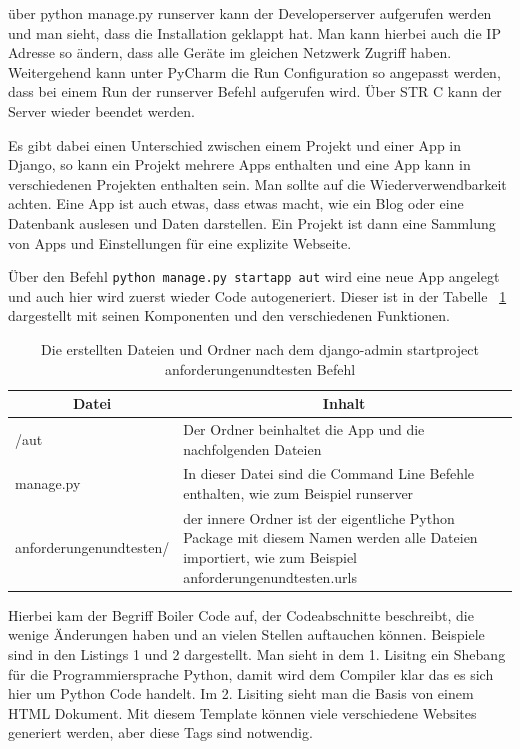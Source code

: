 \documentclass[11pt,a4paper]{report}
\begin{document}
über python manage.py runserver kann der Developerserver aufgerufen werden und man sieht, dass die Installation geklappt hat. Man kann hierbei auch die IP Adresse so ändern, dass alle Geräte im gleichen Netzwerk Zugriff haben. Weitergehend kann unter PyCharm die Run Configuration so angepasst werden, dass bei einem Run der runserver Befehl aufgerufen wird. Über STR C kann der Server wieder beendet werden.


Es gibt dabei einen Unterschied zwischen einem Projekt und einer App in Django, so kann ein Projekt mehrere Apps enthalten und eine App kann in verschiedenen Projekten enthalten sein. Man sollte auf die Wiederverwendbarkeit achten. Eine App ist auch etwas, dass etwas macht, wie ein Blog oder eine Datenbank auslesen und Daten darstellen. Ein Projekt ist dann eine Sammlung von Apps und Einstellungen für eine explizite Webseite.

Über den Befehl \verb|python manage.py startapp aut| wird eine neue App angelegt und auch hier wird zuerst wieder Code autogeneriert. Dieser ist in der Tabelle ~\ref{tab:AutoCode2} dargestellt mit seinen Komponenten und den verschiedenen Funktionen.


\begin{table}
\centering
\begin{tabular}{|p{}|p{}|}
\hline
\multicolumn{1}{|c|}{\textbf{Datei}} & 
\multicolumn{1}{|c|}{\textbf{Inhalt}} \\\hline
/aut & Der Ordner beinhaltet die App und die nachfolgenden Dateien\\\hline
manage.py     & In dieser Datei sind die Command Line Befehle enthalten, wie zum Beispiel runserver \\\hline
anforderungenundtesten/    & der innere Ordner ist der eigentliche Python Package mit diesem Namen werden alle Dateien importiert, wie zum Beispiel anforderungenundtesten.urls \\\hline   
\end{tabular}
\caption{Die erstellten Dateien und Ordner nach dem django-admin startproject anforderungenundtesten Befehl}
\label{tab:AutoCode2}
\end{table}


Hierbei kam der Begriff Boiler Code auf, der Codeabschnitte beschreibt, die wenige Änderungen haben und an vielen Stellen auftauchen können. Beispiele sind in den Listings 1 und 2 dargestellt. Man sieht in dem 1. Lisitng ein Shebang für die Programmiersprache Python, damit wird dem Compiler klar das es sich hier um Python Code handelt. Im 2. Lisiting sieht man die Basis von einem HTML Dokument. Mit diesem Template können viele verschiedene Websites generiert werden, aber diese Tags sind notwendig. %
\end{document}
